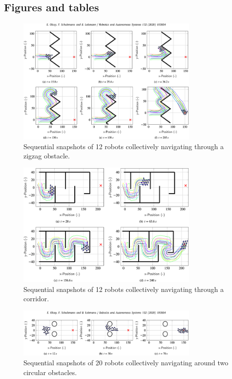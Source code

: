 \documentclass[conference]{IEEEtran}
\begin{document}
\subsection*{Figures and tables}
\begin{figure}[htbp]
    \centering
    \includegraphics[width=0.8\textwidth]{Pictures/Sequential snapshots of 12 robots collectively navigating through a zigzag obstacle.png}
    \caption{Sequential snapshots of 12 robots collectively navigating through a zigzag obstacle.}
    \label{fig:Sequential snapshots of 12 robots collectively navigating through a zigzag obstacle}
\end{figure}
\begin{figure}[htbp]
    \centering
    \includegraphics[width=0.8\textwidth]{Pictures/Sequential snapshots of 12 robots collectively navigating through a corridor.png}
    \caption{Sequential snapshots of 12 robots collectively navigating through a corridor.}
    \label{fig:Sequential snapshots of 12 robots collectively navigating through a corridor}
\end{figure}
\begin{figure}[htbp]
    \centering
    \includegraphics[width=0.8\textwidth]{Pictures/Sequential snapshots of 20 robots collectively navigating around two circular obstacles.png}
    \caption{Sequential snapshots of 20 robots collectively navigating around two circular obstacles.}
    \label{fig:Sequential snapshots of 20 robots collectively navigating around two circular obstacles}
\end{figure}
\end{document}
